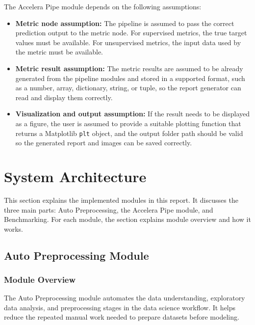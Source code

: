 \documentclass[12pt,a4paper,oneside]{report}
\begin{document}
The Accelera Pipe module depends on the following assumptions:

\begin{itemize}
  \item \textbf{Metric node assumption:} The pipeline is assumed to pass the
  correct prediction output to the metric node. For supervised metrics, the
  true target values must be available. For unsupervised metrics, the input
  data used by the metric must be available.

  \item \textbf{Metric result assumption:} The metric results are assumed to be
  already generated from the pipeline modules and stored in a supported format,
  such as a number, array, dictionary, string, or tuple, so the report generator
  can read and display them correctly.

  \item \textbf{Visualization and output assumption:} If the result needs to be
  displayed as a figure, the user is assumed to provide a suitable plotting
  function that returns a Matplotlib \texttt{plt} object, and the output folder
  path should be valid so the generated report and images can be saved correctly.
\end{itemize}


\chapter{System Architecture}

This section explains the implemented modules in this report. It discusses the three main parts: Auto Preprocessing, the Accelera Pipe module, and Benchmarking. For each module, the section explains module overview and how it works.

\section{Auto Preprocessing Module}
\subsection{Module Overview}
\noindent The Auto Preprocessing module automates the data understanding, exploratory data analysis, and preprocessing stages in the data science workflow. It helps reduce the repeated manual work needed to prepare datasets before modeling.
\end{document}
